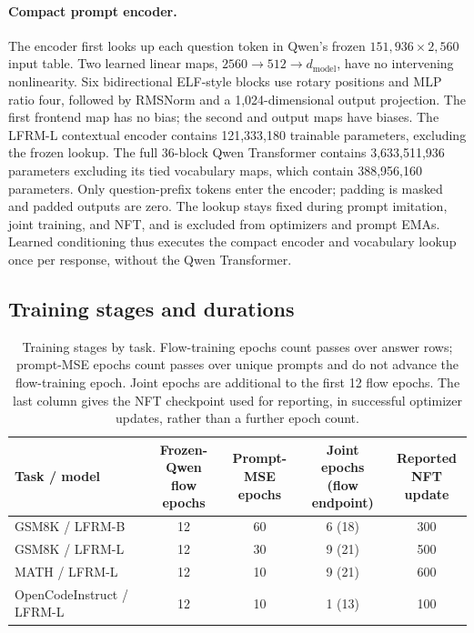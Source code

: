 \documentclass{article}
\begin{document}
\paragraph{Compact prompt encoder.}
The encoder first looks up each question token in Qwen's frozen $151{,}936\times2{,}560$ input table. Two learned linear maps, $2560\to512\to d_{\mathrm{model}}$, have no intervening nonlinearity. Six bidirectional ELF-style blocks use rotary positions and MLP ratio four, followed by RMSNorm and a 1,024-dimensional output projection. The first frontend map has no bias; the second and output maps have biases. The LFRM-L contextual encoder contains 121,333,180 trainable parameters, excluding the frozen lookup. The full 36-block Qwen Transformer contains 3,633,511,936 parameters excluding its tied vocabulary maps, which contain 388,956,160 parameters. Only question-prefix tokens enter the encoder; padding is masked and padded outputs are zero. The lookup stays fixed during prompt imitation, joint training, and NFT, and is excluded from optimizers and prompt EMAs. Learned conditioning thus executes the compact encoder and vocabulary lookup once per response, without the Qwen Transformer.

\subsection{Training stages and durations}
\label{app:trainingstages}

\begin{table}[!htb]
\centering\small
\setlength{\tabcolsep}{5pt}
\caption{Training stages by task. Flow-training epochs count passes over answer rows; prompt-MSE epochs count passes over unique prompts and do not advance the flow-training epoch. Joint epochs are additional to the first 12 flow epochs. The last column gives the NFT checkpoint used for reporting, in successful optimizer updates, rather than a further epoch count.}
\label{tab:trainingstages}
\begin{tabular}{@{}lcccc@{}}
\toprule
Task / model & \shortstack{Frozen-Qwen\\flow epochs} & \shortstack{Prompt-MSE\\epochs} & \shortstack{Joint epochs\\(flow endpoint)} & \shortstack{Reported\\NFT update}\\
\midrule
GSM8K / LFRM-B & 12 & 60 & 6 (18) & 300\\
GSM8K / LFRM-L & 12 & 30 & 9 (21) & 500\\
MATH / LFRM-L & 12 & 10 & 9 (21) & 600\\
OpenCodeInstruct / LFRM-L & 12 & 10 & 1 (13) & 100\\
\bottomrule
\end{tabular}
\end{table}
\end{document}

